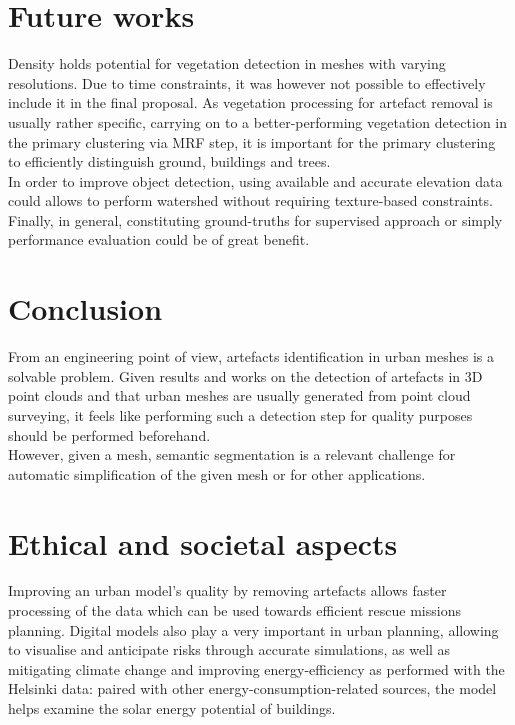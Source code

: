 \documentclass{kththesis}
\begin{document}
\section{Future works}
Density holds potential for vegetation detection in meshes with varying resolutions. Due to time constraints, it was however not possible to effectively include it in the final proposal. As vegetation processing for artefact removal is usually rather specific, carrying on to a better-performing vegetation detection in the primary clustering via MRF step, it is important for the primary clustering to efficiently distinguish ground, buildings and trees. \\
In order to improve object detection, using available and accurate elevation data could allows to perform watershed without requiring texture-based constraints. Finally, in general, constituting ground-truths for supervised approach or simply performance evaluation could be of great benefit. 
\section{Conclusion}
From an engineering point of view, artefacts identification in urban meshes is a solvable problem. Given results and works on the detection of artefacts in 3D point clouds and that urban meshes are usually generated from point cloud surveying, it feels like performing such a detection step for quality purposes should be performed beforehand. \\
However, given a mesh, semantic segmentation is a relevant challenge for automatic simplification of the given mesh or for other applications. 
\section{Ethical and societal aspects}
Improving an urban model's quality by removing artefacts allows faster processing of the data which can be used towards efficient rescue missions planning. Digital models also play a very important in urban planning, allowing to visualise and anticipate risks through accurate simulations, as well as mitigating climate change and improving energy-efficiency as performed with the Helsinki data: paired with other energy-consumption-related sources, the model helps examine the solar energy potential of buildings. 


\printbibliography[heading=bibintoc] %

\end{document}
